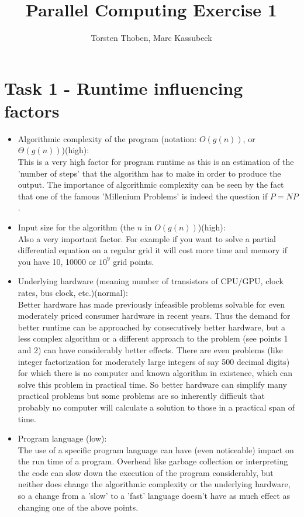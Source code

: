 \documentclass[10pt,a4paper]{article}
\title{Parallel Computing Exercise 1}
\date{}
\author{Torsten Thoben, Marc Kassubeck}
\begin{document}
\maketitle


\section{Task 1 - Runtime influencing factors}
\begin{itemize}
\item Algorithmic complexity of the program (notation: $O(g(n))$, or $\Theta(g(n))$)(high):\\
This is a very high factor for program runtime as this is an estimation of the 'number of steps' that the algorithm has to make in order to produce the output. The importance of algorithmic complexity can be seen by the fact that one of the famous 'Millenium Problems' is indeed the question if $P=NP$.

\item Input size for the algorithm (the $n$ in $O(g(n))$)(high):\\
Also a very important factor. For example if you want to solve a partial differential equation on a regular grid it will cost more time and memory if you have 10, 10000 or $10^9$ grid points.

\item Underlying hardware (meaning number of transistors of CPU/GPU, clock rates, bus clock, etc.)(normal):\\
Better hardware has made previously infeasible problems solvable for even moderately priced consumer hardware in recent years. Thus the demand for better runtime can be approached by consecutively better hardware, but a less complex algorithm or a different approach to the problem (see points 1 and 2) can have considerably better effects. There are even problems (like integer factorization for moderately large integers of say 500 decimal digits) for which there is no computer and known algorithm in existence, which can solve this problem in practical time. So better hardware can simplify many practical problems but some problems are so inherently difficult that probably no computer will calculate a solution to those in a practical span of time.

\item Program language (low):\\
The use of a specific program language can have (even noticeable) impact on the run time of a program. Overhead like garbage collection or interpreting the code can slow down the execution of the program considerably, but neither does change the algorithmic complexity or the underlying hardware, so a change from a 'slow' to a 'fast' language doesn't have as much effect as changing one of the above points. 

\end{itemize}
\end{document}
